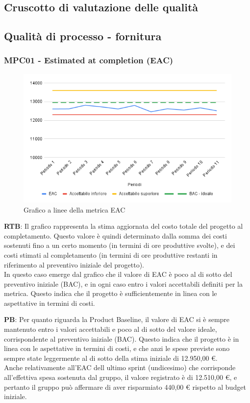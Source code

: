 \documentclass[10pt]{article}
\begin{document}
\begin{justify}
\section{Cruscotto di valutazione delle qualità}
\label{sec:cruscotto}
\subsection{Qualità di processo - fornitura}
\label{sec:QdP_fornitura}
\subsubsection{MPC01 - Estimated at completion (EAC)}

\begin{figure}[H]
  \centering
  \includegraphics[width=0.9\linewidth]{EAC.png}
  \caption{Grafico a linee della metrica EAC}
  \label{fig:EACchart}
\end{figure}


\textbf{RTB}: Il grafico rappresenta la stima aggiornata del costo totale del progetto al completamento. Questo valore è quindi determinato dalla somma 
dei costi sostenuti fino a un certo momento (in termini di ore produttive svolte), e dei costi stimati al completamento (in termini di ore produttive 
restanti in riferimento al preventivo iniziale del progetto).\\ 
In questo caso emerge dal grafico che il valore di EAC è poco al di sotto del preventivo iniziale (BAC), e in ogni caso entro i valori accettabili definiti
per la metrica. Questo indica che il progetto è sufficientemente in linea con le aspettative in termini di costi.

\noindent
\textbf{PB}: Per quanto riguarda la Product Baseline, il valore di EAC si è sempre mantenuto entro i valori accettabili e poco al di sotto del valore ideale,
corrispondente al preventivo iniziale (BAC). Questo indica che il progetto è in linea con le aspettative in termini di costi, e che anzi le spese previste sono sempre
state leggermente al di sotto della stima iniziale di 12.950,00 €.\\
Anche relativamente all'EAC dell ultimo sprint (undicesimo) che corrisponde all'effettiva spesa sostenuta dal gruppo, il valore registrato è di 12.510,00 €, e pertanto
il gruppo può affermare di aver risparmiato 440,00 € rispetto al budget iniziale.\\



\end{justify}
\end{document}
